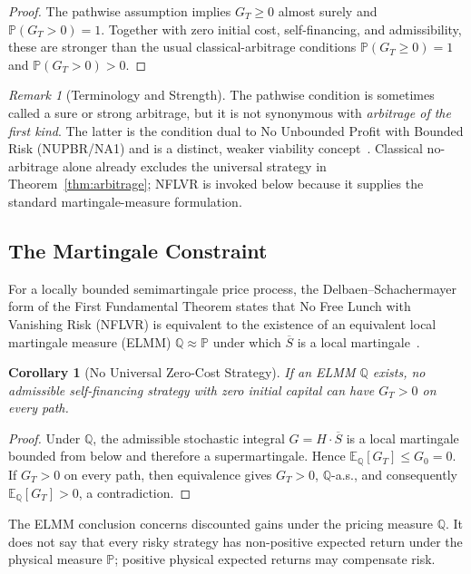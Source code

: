 \documentclass[aps,pra,reprint,superscriptaddress,amsmath,amssymb]{revtex4-2}
\theoremstyle{plain}
\newtheorem{corollary}[theorem]{Corollary}
\theoremstyle{definition}
\theoremstyle{remark}
\newtheorem{remark}{Remark}
\begin{document}
\begin{proof}
The pathwise assumption implies \(G_T\geq0\) almost surely and
\(\mathbb{P}(G_T>0)=1\). Together with zero initial cost, self-financing, and
admissibility, these are stronger than the usual classical-arbitrage
conditions \(\mathbb{P}(G_T\geq0)=1\) and
\(\mathbb{P}(G_T>0)>0\).
\end{proof}

\begin{remark}[Terminology and Strength]
The pathwise condition is sometimes called a sure or strong arbitrage, but it
is not synonymous with \emph{arbitrage of the first kind}. The latter is the
condition dual to No Unbounded Profit with Bounded Risk (NUPBR/NA1) and is a
distinct, weaker viability concept~\cite{Kardaras2012}. Classical
no-arbitrage alone already excludes the universal strategy in
Theorem~\ref{thm:arbitrage}; NFLVR is invoked below because it supplies the
standard martingale-measure formulation.
\end{remark}

\subsection{The Martingale Constraint}

For a locally bounded semimartingale price process, the
Delbaen--Schachermayer form of the First Fundamental Theorem states that No
Free Lunch with Vanishing Risk (NFLVR) is equivalent to the existence of an
equivalent local martingale measure (ELMM)
\(\mathbb{Q}\approx\mathbb{P}\) under which \(\overline S\) is a local
martingale~\cite{Harrison1981,Delbaen1994}.

\begin{corollary}[No Universal Zero-Cost Strategy]
  \label{cor:noarb}
  If an ELMM \(\mathbb{Q}\) exists, no admissible self-financing strategy with
  zero initial capital can have \(G_T>0\) on every path.
\end{corollary}

\begin{proof}
Under \(\mathbb{Q}\), the admissible stochastic integral
\(G=H\mathbin{\cdot}\overline S\) is a local martingale bounded from below and
therefore a supermartingale. Hence
\(\mathbb{E}_{\mathbb{Q}}[G_T]\leq G_0=0\). If \(G_T>0\) on every path, then
equivalence gives \(G_T>0\), \(\mathbb{Q}\)-a.s., and consequently
\(\mathbb{E}_{\mathbb{Q}}[G_T]>0\), a contradiction.
\end{proof}

The ELMM conclusion concerns discounted gains under the pricing measure
\(\mathbb{Q}\). It does not say that every risky strategy has non-positive
expected return under the physical measure \(\mathbb{P}\); positive physical
expected returns may compensate risk.
\end{document}
